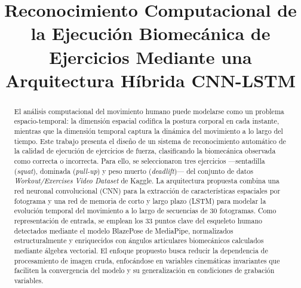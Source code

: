 \documentclass[conference]{IEEEtran}
\begin{document}
\title{Reconocimiento Computacional de la Ejecución Biomecánica
       de Ejercicios Mediante una Arquitectura Híbrida CNN-LSTM}

\author{
  \and
}

\maketitle

\begin{abstract}
El análisis computacional del movimiento humano puede modelarse
como un problema espacio-temporal: la dimensión espacial codifica
la postura corporal en cada instante, mientras que la dimensión
temporal captura la dinámica del movimiento a lo largo del tiempo.
Este trabajo presenta el diseño de un sistema de reconocimiento
automático de la calidad de ejecución de ejercicios de fuerza,
clasificando la biomecánica observada como correcta o incorrecta.
Para ello, se seleccionaron tres ejercicios —sentadilla
(\textit{squat}), dominada (\textit{pull-up}) y peso muerto
(\textit{deadlift})— del conjunto de datos
\textit{Workout/Exercises Video Dataset} de Kaggle.
La arquitectura propuesta combina una red neuronal convolucional
(CNN) para la extracción de características espaciales por
fotograma y una red de memoria de corto y largo plazo (LSTM) para
modelar la evolución temporal del movimiento a lo largo de
secuencias de 30 fotogramas. Como representación de entrada, se
emplean los 33 puntos clave del esqueleto humano detectados
mediante el modelo BlazePose de MediaPipe, normalizados
estructuralmente y enriquecidos con ángulos articulares
biomecánicos calculados mediante álgebra vectorial. El enfoque
propuesto busca reducir la dependencia de procesamiento de imagen
cruda, enfocándose en variables cinemáticas invariantes que
faciliten la convergencia del modelo y su generalización en
condiciones de grabación variables.
\end{abstract}
\end{document}

